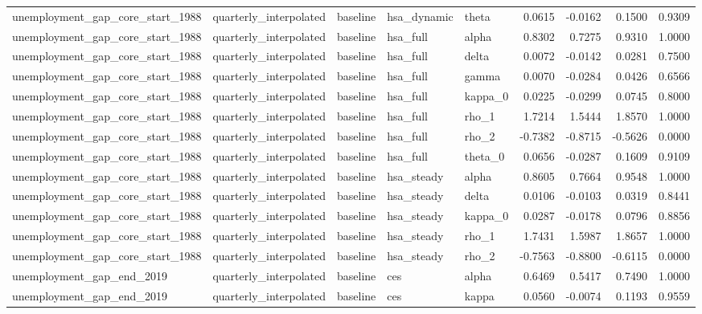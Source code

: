 \begin{tabular}{lllllrrrr}
unemployment\_gap\_core\_start\_1988 & quarterly\_interpolated & baseline & hsa\_dynamic & theta & 0.0615 & -0.0162 & 0.1500 & 0.9309 \\
unemployment\_gap\_core\_start\_1988 & quarterly\_interpolated & baseline & hsa\_full & alpha & 0.8302 & 0.7275 & 0.9310 & 1.0000 \\
unemployment\_gap\_core\_start\_1988 & quarterly\_interpolated & baseline & hsa\_full & delta & 0.0072 & -0.0142 & 0.0281 & 0.7500 \\
unemployment\_gap\_core\_start\_1988 & quarterly\_interpolated & baseline & hsa\_full & gamma & 0.0070 & -0.0284 & 0.0426 & 0.6566 \\
unemployment\_gap\_core\_start\_1988 & quarterly\_interpolated & baseline & hsa\_full & kappa\_0 & 0.0225 & -0.0299 & 0.0745 & 0.8000 \\
unemployment\_gap\_core\_start\_1988 & quarterly\_interpolated & baseline & hsa\_full & rho\_1 & 1.7214 & 1.5444 & 1.8570 & 1.0000 \\
unemployment\_gap\_core\_start\_1988 & quarterly\_interpolated & baseline & hsa\_full & rho\_2 & -0.7382 & -0.8715 & -0.5626 & 0.0000 \\
unemployment\_gap\_core\_start\_1988 & quarterly\_interpolated & baseline & hsa\_full & theta\_0 & 0.0656 & -0.0287 & 0.1609 & 0.9109 \\
unemployment\_gap\_core\_start\_1988 & quarterly\_interpolated & baseline & hsa\_steady & alpha & 0.8605 & 0.7664 & 0.9548 & 1.0000 \\
unemployment\_gap\_core\_start\_1988 & quarterly\_interpolated & baseline & hsa\_steady & delta & 0.0106 & -0.0103 & 0.0319 & 0.8441 \\
unemployment\_gap\_core\_start\_1988 & quarterly\_interpolated & baseline & hsa\_steady & kappa\_0 & 0.0287 & -0.0178 & 0.0796 & 0.8856 \\
unemployment\_gap\_core\_start\_1988 & quarterly\_interpolated & baseline & hsa\_steady & rho\_1 & 1.7431 & 1.5987 & 1.8657 & 1.0000 \\
unemployment\_gap\_core\_start\_1988 & quarterly\_interpolated & baseline & hsa\_steady & rho\_2 & -0.7563 & -0.8800 & -0.6115 & 0.0000 \\
unemployment\_gap\_end\_2019 & quarterly\_interpolated & baseline & ces & alpha & 0.6469 & 0.5417 & 0.7490 & 1.0000 \\
unemployment\_gap\_end\_2019 & quarterly\_interpolated & baseline & ces & kappa & 0.0560 & -0.0074 & 0.1193 & 0.9559 \\

\end{tabular}
